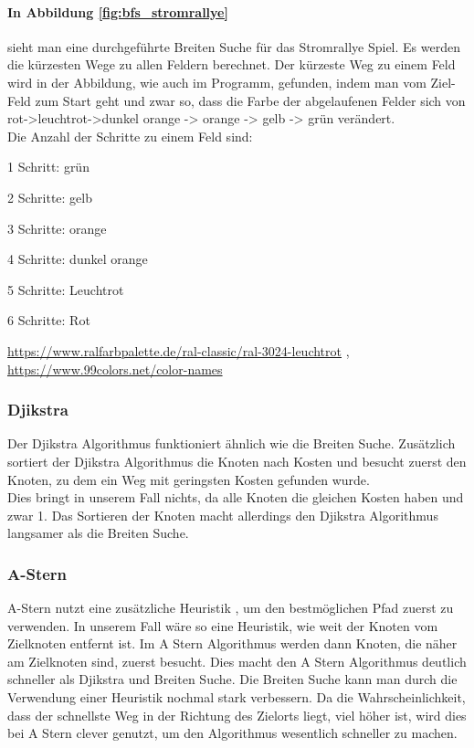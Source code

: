 \documentclass[a4paper,12pt,arial]{scrartcl}
\begin{document}
\paragraph{In Abbildung \ref{fig:bfs_stromrallye}}
 sieht man eine durchgeführte Breiten Suche für das Stromrallye Spiel. Es werden die kürzesten Wege zu allen Feldern berechnet. Der kürzeste Weg zu einem Feld wird in der Abbildung, wie auch im Programm, gefunden, indem man vom Ziel-Feld zum Start geht und zwar so, dass die Farbe der abgelaufenen Felder sich von rot->leuchtrot->dunkel orange -> orange -> gelb -> grün verändert.
\setlength{\itemsep}{-60pt}
\\
Die Anzahl der Schritte zu einem Feld sind:
\small
\begin{compactitem}
\item 1 Schritt: grün
\item 2 Schritte: gelb
\item 3 Schritte: orange
\item 4 Schritte: dunkel orange
\item 5 Schritte: Leuchtrot
\item 6 Schritte: Rot
\end{compactitem}
\tiny{ \url{https://www.ralfarbpalette.de/ral-classic/ral-3024-leuchtrot}}  , \tiny{\url{https://www.99colors.net/color-names}}
\normalsize
\subsubsection{Djikstra}
Der Djikstra Algorithmus funktioniert ähnlich wie die Breiten Suche. Zusätzlich sortiert der Djikstra Algorithmus die Knoten nach Kosten und besucht zuerst den Knoten, zu dem ein Weg mit geringsten Kosten gefunden wurde. \cite{dijkstra}
\\
Dies bringt in unserem Fall nichts, da alle Knoten die gleichen Kosten haben und zwar 1.  Das Sortieren der Knoten macht allerdings den Djikstra Algorithmus langsamer  als die Breiten Suche.
\subsubsection{A-Stern}
 A-Stern nutzt eine zusätzliche Heuristik , um den bestmöglichen Pfad zuerst zu verwenden.
In unserem Fall wäre so eine Heuristik, wie weit der Knoten vom Zielknoten entfernt ist. 
Im A Stern Algorithmus werden dann Knoten, die näher am Zielknoten sind, zuerst besucht.
Dies macht den A Stern Algorithmus deutlich schneller als Djikstra und Breiten Suche.
Die Breiten Suche kann man durch die Verwendung einer Heuristik nochmal stark verbessern.
Da die Wahrscheinlichkeit, dass der schnellste Weg in der Richtung des Zielorts liegt, viel höher ist, wird dies bei  A Stern clever genutzt, um den Algorithmus wesentlich schneller zu machen. \cite{hart}
\end{document}
